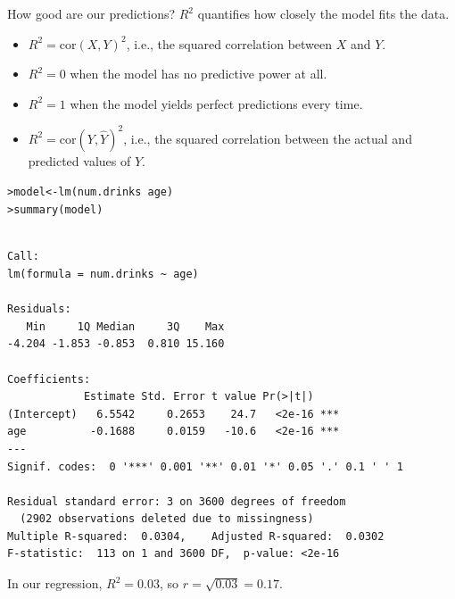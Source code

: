 \documentclass{beamer}\usepackage[]{graphicx}\usepackage[]{color}
\makeatletter
\newcommand{\hlopt}[1]{\textcolor[rgb]{1,0.894,0.769}{#1}}%
\newcommand{\hlstd}[1]{\textcolor[rgb]{1,0.894,0.769}{#1}}%
\newcommand{\hlkwb}[1]{\textcolor[rgb]{0.804,0.776,0.451}{#1}}%
\newcommand{\hlkwd}[1]{\textcolor[rgb]{1,0.78,0.769}{#1}}%
\newenvironment{kframe}{%
 \def\at@end@of@kframe{}%
 \ifinner\ifhmode%
  \def\at@end@of@kframe{\end{minipage}}%
  \begin{minipage}{\columnwidth}%
 \fi\fi%
 \def\FrameCommand##1{\hskip\@totalleftmargin \hskip-\fboxsep
 \colorbox{shadecolor}{##1}\hskip-\fboxsep
     \hskip-\linewidth \hskip-\@totalleftmargin \hskip\columnwidth}%
 \MakeFramed {\advance\hsize-\width
   \@totalleftmargin\z@ \linewidth\hsize
   \@setminipage}}%
 {\par\unskip\endMakeFramed%
 \at@end@of@kframe}
\newenvironment{knitrout}{}{} %
\makeatother
\begin{document}
\begin{darkframes}
    \begin{frame}{How good are our predictions?}
      $R^2$ quantifies how closely the model fits the data.
      \begin{itemize}[<+->]
        \item $R^2=\text{cor}(X,Y)^2$, i.e., the squared correlation between $X$ and $Y$.
        \item $R^2=0$ when the model has no predictive power at all.
        \item $R^2=1$ when the model yields perfect predictions every time.
        \item $R^2=\text{cor}(Y,\hat Y)^2$, i.e., the squared correlation between the actual and predicted values of $Y$.
      \end{itemize}
    \end{frame}

    \begin{frame}[fragile]
      \fontsize{9}{9}\selectfont
\begin{knitrout}
\begin{kframe}
\begin{alltt}
\hlstd{> }\hlstd{model} \hlkwb{<-} \hlkwd{lm}\hlstd{(num.drinks} \hlopt{~} \hlstd{age)}
\hlstd{> }\hlkwd{summary}\hlstd{(model)}
\end{alltt}
\begin{verbatim}

Call:
lm(formula = num.drinks ~ age)

Residuals:
   Min     1Q Median     3Q    Max 
-4.204 -1.853 -0.853  0.810 15.160 

Coefficients:
            Estimate Std. Error t value Pr(>|t|)    
(Intercept)   6.5542     0.2653    24.7   <2e-16 ***
age          -0.1688     0.0159   -10.6   <2e-16 ***
---
Signif. codes:  0 '***' 0.001 '**' 0.01 '*' 0.05 '.' 0.1 ' ' 1

Residual standard error: 3 on 3600 degrees of freedom
  (2902 observations deleted due to missingness)
Multiple R-squared:  0.0304,	Adjusted R-squared:  0.0302 
F-statistic:  113 on 1 and 3600 DF,  p-value: <2e-16
\end{verbatim}
\end{kframe}
\end{knitrout}
    \end{frame} 

    \begin{frame}
      In our regression, $R^2=0.03$, so $r=\sqrt{0.03}=0.17$.  


\end{frame}
\end{darkframes}
\end{document}
